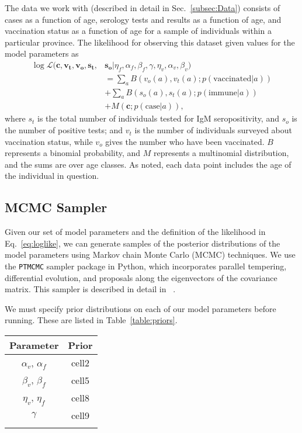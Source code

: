 \documentclass[nofootinbib,aps,pre,twocolumn,superscriptaddress,showkeys,showpacs]{revtex4-1}
\begin{document}
The data we work with (described in detail in Sec.~\ref{subsec:Data}) consists of cases as a function of age, serology tests and results as a function of age, and vaccination status as a function of age for a sample of individuals within a particular province. The likelihood for observing this dataset given values for the model parameters as
\begin{align}
\log \mathcal{L} (\mathbf{c}, \mathbf{v_t}, \mathbf{v_o}, \mathbf{s_t},&\mathbf{s_o}|\eta_f, \alpha_f, \beta_f, \gamma, \eta_v, \alpha_v, \beta_v)\nonumber \\ 
& = \sum_aB\left(v_o(a), v_t(a); p(\mathrm{vaccinated}|a)\right) \nonumber \\
&+ \sum_a B\left(s_o(a),s_t(a);p(\mathrm{immune}|a)\right) \nonumber \\
&+ M\left(\mathbf{c};p(\mathrm{case}|a)\right),
\label{eq:loglike}
\end{align}
where $s_t$ is the total number of individuals tested for IgM seropositivity, and $s_o$ is the number of positive tests; and $v_t$ is the number of individuals surveyed about vaccination status, while $v_o$ gives the number who have been vaccinated. $B$ represents a binomial probability, and $M$ represents a multinomial distribution, and the sums are over age classes. As noted, each data point includes the age of the individual in question.

\subsection{MCMC Sampler \label{subsec:MCMC}}
Given our set of model parameters and the definition of the likelihood in Eq.~\ref{eq:loglike}, we can generate samples of the posterior distributions of the model parameters using Markov chain Monte Carlo (MCMC) techniques. We use the \texttt{PTMCMC} sampler package in Python, which incorporates parallel tempering, differential evolution, and proposals along the eigenvectors of the covariance matrix. This sampler is described in detail in ~\cite{Arzoumanian2014}.

We must specify prior distributions on each of our model parameters before running. These are listed in Table~\ref{table:priors}. 
\begin{center}
\begin{tabular}{ c|c } 
Parameter & Prior \\
 \hline
 $\alpha_v$, $\alpha_f$ & cell2 \\ 
 $\beta_v$, $\beta_f$ & cell5 \\ 
 $\eta_v$, $\eta_f$& cell8 \\ 
 $\gamma$ & cell9 \\
 \hline
 \label{table:priors}
\end{tabular}
\end{center}
\end{document}
